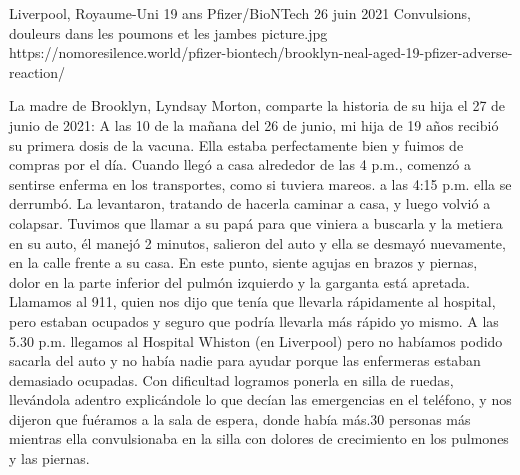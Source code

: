           {Liverpool, Royaume-Uni}
          {19 ans}
          {Pfizer/BioNTech}
          {26 juin 2021}
          {Convulsions, douleurs dans les poumons et les jambes}
          {picture.jpg}
          {https://nomoresilence.world/pfizer-biontech/brooklyn-neal-aged-19-pfizer-adverse-reaction/}
          {

\normalsize

La madre de Brooklyn, Lyndsay Morton, comparte la historia de su hija el 27 de
junio de 2021: A las 10 de la mañana del 26 de junio, mi hija de 19 años recibió
su primera dosis de la vacuna. Ella estaba perfectamente bien y fuimos de
compras por el día. Cuando llegó a casa alrededor de las 4 p.m., comenzó a
sentirse enferma en los transportes, como si tuviera mareos. a las 4:15
p.m. ella se derrumbó. La levantaron, tratando de hacerla caminar a casa, y
luego volvió a colapsar. Tuvimos que llamar a su papá para que viniera a
buscarla y la metiera en su auto, él manejó 2 minutos, salieron del auto y ella
se desmayó nuevamente, en la calle frente a su casa. En este punto, siente
agujas en brazos y piernas, dolor en la parte inferior del pulmón izquierdo y la
garganta está apretada. Llamamos al 911, quien nos dijo que tenía que llevarla
rápidamente al hospital, pero estaban ocupados y seguro que podría llevarla más
rápido yo mismo. A las 5.30 p.m. llegamos al Hospital Whiston (en Liverpool)
pero no habíamos podido sacarla del auto y no había nadie para ayudar porque las
enfermeras estaban demasiado ocupadas. Con dificultad logramos ponerla en silla
de ruedas, llevándola adentro explicándole lo que decían las emergencias en el
teléfono, y nos dijeron que fuéramos a la sala de espera, donde había más.30
personas más mientras ella convulsionaba en la silla con dolores de crecimiento
en los pulmones y las piernas.

}
